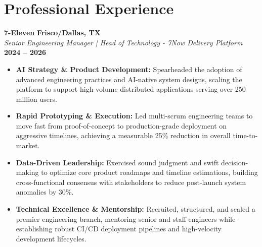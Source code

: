 \documentclass[9pt, letterpaper]{extarticle}
\begin{document}
\section{Professional Experience}

\textbf{7-Eleven} \hfill \textbf{Frisco/Dallas, TX} \\
\textit{Senior Engineering Manager | Head of Technology - 7Now Delivery Platform} \hfill \textbf{2024 -- 2026}
\begin{itemize}
    \item \textbf{AI Strategy \& Product Development:} Spearheaded the adoption of advanced engineering practices and AI-native system designs, scaling the platform to support high-volume distributed applications serving over 250 million users.
    \item \textbf{Rapid Prototyping \& Execution:} Led multi-scrum engineering teams to move fast from proof-of-concept to production-grade deployment on aggressive timelines, achieving a measurable 25\% reduction in overall time-to-market.
    \item \textbf{Data-Driven Leadership:} Exercised sound judgment and swift decision-making to optimize core product roadmaps and timeline estimations, building cross-functional consensus with stakeholders to reduce post-launch system anomalies by 30\%.
    \item \textbf{Technical Excellence \& Mentorship:} Recruited, structured, and scaled a premier engineering branch, mentoring senior and staff engineers while establishing robust CI/CD deployment pipelines and high-velocity development lifecycles.
\end{itemize}

\vspace{6pt}
\end{document}
